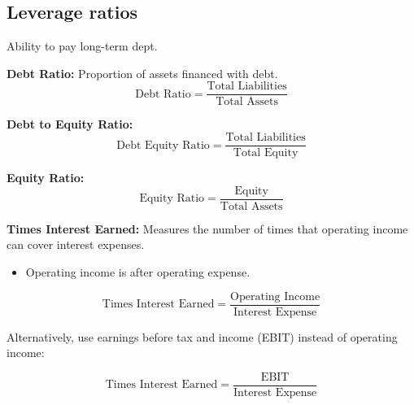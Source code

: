 \subsection{Leverage ratios}
\begin{definition} Ability to pay long-term dept.

    \textbf{Debt Ratio:} Proportion of assets financed with debt.
    \begin{equation}
        \text{Debt Ratio} = \frac{\text{Total Liabilities}}{\text{Total Assets}}
    \end{equation}
    \vspace{1em}
    
    \textbf{Debt to Equity Ratio:}
    \begin{equation}
        \text{Debt Equity Ratio} = \frac{\text{Total Liabilities}}{\text{Total Equity}}
    \end{equation}
    \vspace{1em}
    
    \textbf{Equity Ratio:}
    \begin{equation}
        \text{Equity Ratio} = \frac{\text{Equity}}{\text{Total Assets}}
    \end{equation}
    \vspace{1em}
    
    \textbf{Times Interest Earned:} Measures the number of times that operating income can cover interest expenses.
    \begin{itemize}
        \item Operating income is after operating expense.
    \end{itemize}
    \begin{equation}
        \text{Times Interest Earned} = \frac{\text{Operating Income}}{\text{Interest Expense}}
    \end{equation}

    Alternatively, use earnings before tax and income (EBIT) instead of operating income:

    \begin{equation}
        \text{Times Interest Earned} = \frac{\text{EBIT}}{\text{Interest Expense}}
    \end{equation}
\end{definition}


